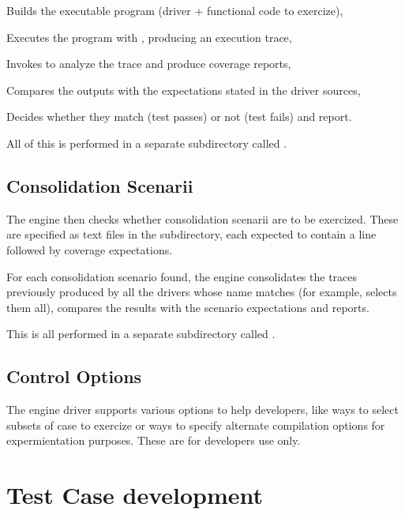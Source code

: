 \documentclass {report}
\begin{document}
\begin{Itemize}  
\item%
  Builds the executable program (driver + functional code to exercize),

\item%
  Executes the program with , producing an execution trace,

\item%
  Invokes  to analyze the trace and produce coverage
  reports,

\item%
  Compares the outputs with the expectations stated in the driver sources,

\item%
  Decides whether they match (test passes) or not (test fails) and report.
\end{Itemize}  

All of this is performed in a separate subdirectory called .


\subsection{Consolidation Scenarii}

The engine then checks whether consolidation scenarii are to be exercized.
%
These are specified as  text files in the 
subdirectory, each expected to contain a  line followed by
coverage expectations.

For each consolidation scenario found, the engine consolidates the traces
previously produced by all the drivers whose name matches  (for
example,   selects them all), compares the results with the scenario
expectations and reports.

This is all performed in a separate subdirectory called
 .

\subsection{Control Options}

The engine driver supports various options to help developers, like
ways to select subsets of case to exercize or ways to specify alternate
compilation options for expermientation purposes.
%
These are for \xcov{} developers use only.

\section{Test Case development}
\label{sec:tc-dev}
\end{document}
